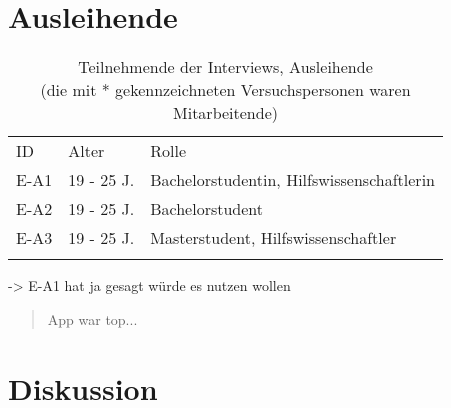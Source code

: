 \section{Ausleihende}

\begin{table}[h]
  \centering
  \caption{Teilnehmende der Interviews, Ausleihende \\
    (die mit * gekennzeichneten Versuchspersonen waren Mitarbeitende)}
  \begin{tabular}{lll}
    \arrayrulecolor{maincolor}\hline
    \sffamily\color{maincolor}ID & \sffamily\color{maincolor}Alter &
    \sffamily\color{maincolor}Rolle
    \\
    \arrayrulecolor{maincolor}\hline
    E-A1                         & 19 - 25 J.                      &
    Bachelorstudentin, Hilfswissenschaftlerin
    \\
    E-A2                         & 19 - 25 J.                      &
    Bachelorstudent                                                  \\
    E-A3                         & 19 - 25 J.                      &
    Masterstudent, Hilfswissenschaftler
    \\
    \arrayrulecolor{maincolor}\hline
  \end{tabular}
  \label{table:azwei}
\end{table}


-> E-A1 hat ja gesagt würde es nutzen wollen

\blockquote{App war top...}


\section{Diskussion}